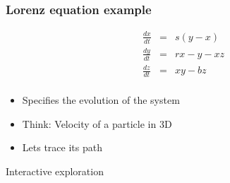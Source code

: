 \documentclass[14pt,compress]{beamer}
\newcounter{time}
\newcommand{\inctime}[1]{\addtocounter{time}{#1}{\tiny \thetime\ m}}
\begin{document}
\begin{frame}
    \frametitle{Lorenz equation example}
    \begin{eqnarray*}
        \frac{d x}{dt} &=& s (y-x)\\
        \frac{d y}{d t} &=& rx -y -xz\\
        \frac{d z}{d t} &=& xy - bz\\
    \end{eqnarray*}
    \begin{itemize}
        \item Specifies the evolution of the system
        \item Think: Velocity of a particle in 3D
        \item Lets trace its path
    \end{itemize}
\end{frame}

\begin{frame}
    {Interactive exploration}

    \inctime{25}
\end{frame}
\end{document}
